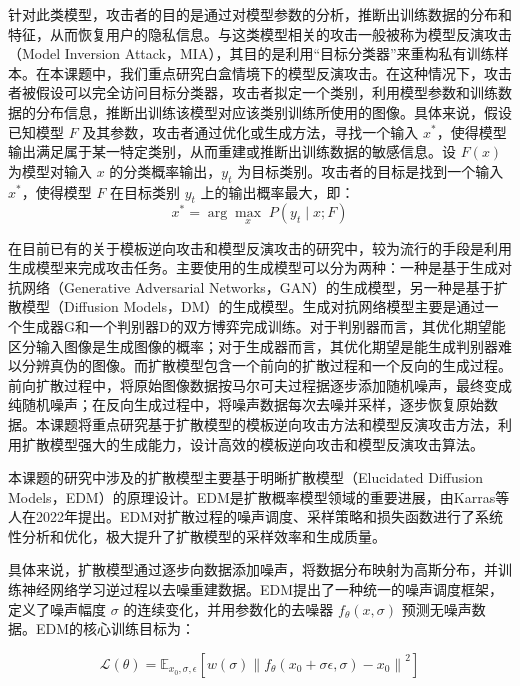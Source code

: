 针对此类模型，攻击者的目的是通过对模型参数的分析，推断出训练数据的分布和特征，从而恢复用户的隐私信息。与这类模型相关的攻击一般被称为模型反演攻击（Model Inversion Attack，MIA），其目的是利用“目标分类器”来重构私有训练样本。在本课题中，我们重点研究白盒情境下的模型反演攻击。在这种情况下，攻击者被假设可以完全访问目标分类器，攻击者拟定一个类别，利用模型参数和训练数据的分布信息，推断出训练该模型对应该类别训练所使用的图像。具体来说，假设已知模型 $F$ 及其参数，攻击者通过优化或生成方法，寻找一个输入 $x^*$，使得模型输出满足属于某一特定类别，从而重建或推断出训练数据的敏感信息。设 $F(x)$ 为模型对输入 $x$ 的分类概率输出，$y_{t}$ 为目标类别。攻击者的目标是找到一个输入 $x^*$，使得模型 $F$ 在目标类别 $y_t$ 上的输出概率最大，即：
\begin{equation}
  x^* = \arg\max_{x} \; P(y_t \mid x; F)
\end{equation}


在目前已有的关于模板逆向攻击和模型反演攻击的研究中，较为流行的手段是利用生成模型来完成攻击任务。主要使用的生成模型可以分为两种：一种是基于生成对抗网络（Generative Adversarial Networks，GAN）的生成模型，另一种是基于扩散模型（Diffusion Models，DM）的生成模型。生成对抗网络模型主要是通过一个生成器G和一个判别器D的双方博弈完成训练。对于判别器而言，其优化期望能区分输入图像是生成图像的概率；对于生成器而言，其优化期望是能生成判别器难以分辨真伪的图像。而扩散模型包含一个前向的扩散过程和一个反向的生成过程。前向扩散过程中，将原始图像数据按马尔可夫过程据逐步添加随机噪声，最终变成纯随机噪声；在反向生成过程中，将噪声数据每次去噪并采样，逐步恢复原始数据。本课题将重点研究基于扩散模型的模板逆向攻击方法和模型反演攻击方法，利用扩散模型强大的生成能力，设计高效的模板逆向攻击和模型反演攻击算法。

本课题的研究中涉及的扩散模型主要基于明晰扩散模型（Elucidated Diffusion Models，EDM）的原理设计。EDM是扩散概率模型领域的重要进展，由Karras等人在2022年提出。EDM对扩散过程的噪声调度、采样策略和损失函数进行了系统性分析和优化，极大提升了扩散模型的采样效率和生成质量。

具体来说，扩散模型通过逐步向数据添加噪声，将数据分布映射为高斯分布，并训练神经网络学习逆过程以去噪重建数据。EDM提出了一种统一的噪声调度框架，定义了噪声幅度 $\sigma$ 的连续变化，并用参数化的去噪器 $f_\theta(x, \sigma)$ 预测无噪声数据。EDM的核心训练目标为：

\begin{equation}
  \mathcal{L}(\theta) = \mathbb{E}_{x_0, \sigma, \epsilon} \left[ w(\sigma) \left\| f_\theta(x_0 + \sigma \epsilon, \sigma) - x_0 \right\|^2 \right]
\end{equation}

